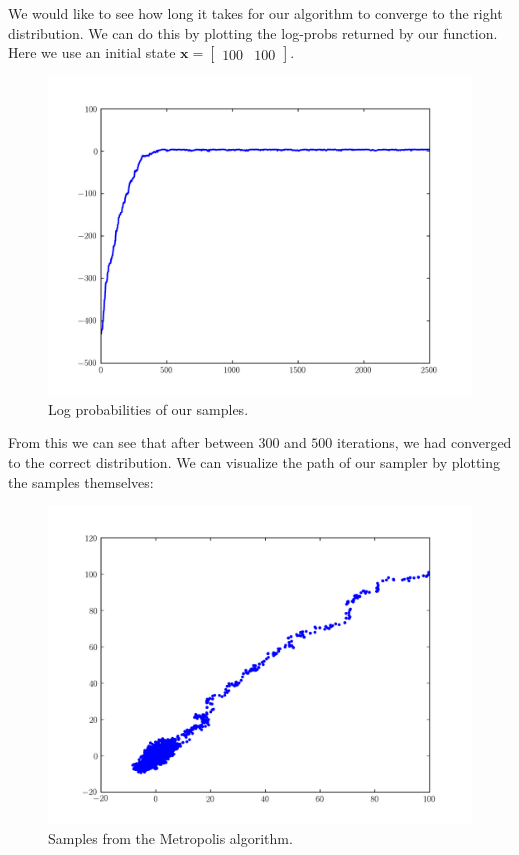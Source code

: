 We would like to see how long it takes for our algorithm to converge to the right distribution. We can do this by plotting the log-probs returned by our function. Here we use an initial state $\mathbf{x} = \left[\begin{array}{cc} 100 & 100 \end{array}\right]$.

\begin{figure}[h]
\centering
\includegraphics[width=\textwidth]{logprobs.pdf}
\caption{Log probabilities of our samples.}
\end{figure}

From this we can see that after between $300$ and $500$ iterations, we had converged to the correct distribution. We can visualize the path of our sampler by plotting the samples themselves:
\begin{figure}[h]
\centering
\includegraphics[width=\textwidth]{samples.pdf}
\caption{Samples from the Metropolis algorithm.}
\end{figure}

